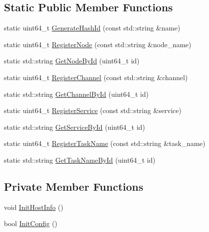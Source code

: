 \subsection*{Static Public Member Functions}
\begin{DoxyCompactItemize}
\item 
static uint64\-\_\-t \hyperlink{classapollo_1_1cyber_1_1common_1_1GlobalData_afc3ae45dd4d4d8a7f58be886278868fd}{Generate\-Hash\-Id} (const std\-::string \&name)
\item 
static uint64\-\_\-t \hyperlink{classapollo_1_1cyber_1_1common_1_1GlobalData_abdf52d28bad0e345e1e10187dd162ef5}{Register\-Node} (const std\-::string \&node\-\_\-name)
\item 
static std\-::string \hyperlink{classapollo_1_1cyber_1_1common_1_1GlobalData_a41d3e913a6731fa546fb92b8116225d4}{Get\-Node\-By\-Id} (uint64\-\_\-t id)
\item 
static uint64\-\_\-t \hyperlink{classapollo_1_1cyber_1_1common_1_1GlobalData_a26e453f2a86db03acf98831cddada877}{Register\-Channel} (const std\-::string \&channel)
\item 
static std\-::string \hyperlink{classapollo_1_1cyber_1_1common_1_1GlobalData_aa5ae9e9ab709bb13fb4dc78b1d496ed6}{Get\-Channel\-By\-Id} (uint64\-\_\-t id)
\item 
static uint64\-\_\-t \hyperlink{classapollo_1_1cyber_1_1common_1_1GlobalData_aec94b2b14e6a688047079359425bd722}{Register\-Service} (const std\-::string \&service)
\item 
static std\-::string \hyperlink{classapollo_1_1cyber_1_1common_1_1GlobalData_a2e1b9892463890d8db30adb7f6df3271}{Get\-Service\-By\-Id} (uint64\-\_\-t id)
\item 
static uint64\-\_\-t \hyperlink{classapollo_1_1cyber_1_1common_1_1GlobalData_a47232f187a9a19fe153dc016086d3e67}{Register\-Task\-Name} (const std\-::string \&task\-\_\-name)
\item 
static std\-::string \hyperlink{classapollo_1_1cyber_1_1common_1_1GlobalData_a57aa373577f79859997b0cc1927f7507}{Get\-Task\-Name\-By\-Id} (uint64\-\_\-t id)
\end{DoxyCompactItemize}
\subsection*{Private Member Functions}
\begin{DoxyCompactItemize}
\item 
void \hyperlink{classapollo_1_1cyber_1_1common_1_1GlobalData_a5434087f192431f4e8261cc4188db09d}{Init\-Host\-Info} ()
\item 
bool \hyperlink{classapollo_1_1cyber_1_1common_1_1GlobalData_a82f8e1f2dc28bab4c49a44374cf8db90}{Init\-Config} ()
\end{DoxyCompactItemize}
